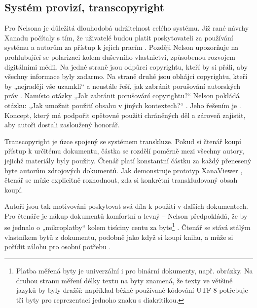 


\subsection{Systém provizí, transcopyright}
\label{sec:transcopyright}

Pro Nelsona je důležitá dlouhodobá udržitelnost celého systému. Již rané návrhy Xanadu počítaly s tím, že uživatelé budou platit poskytovateli za používání systému a autorům za přístup k jejich pracím \autocite{Nelson1972a}.
Později Nelson upozorňuje na prohlubující se polarizaci kolem duševního vlastnictví, způsobenou rozvojem digitálními médii. Na jedné straně jsou odpůrci copyrightu, kteří by si přáli, aby všechny informace byly zadarmo. Na straně druhé jsou obhájci copyrightu, kteří by „nejraději vše uzamkli“ a neustále řeší, jak zabránit porušování autorských práv \autocite{xanalogical}.
Namísto otázky „Jak zabránit porušování copyrightu?“ Nelson pokládá otázku: „Jak umožnit použití obsahu v jiných kontextech?“ \autocite{Transcopyright}. Jeho řešením je . Koncept, který má podpořit opětovné použití chráněných děl a zároveň zajistit, aby autoři dostali zasloužený honorář.

Transcopyright je úzce spojený se systémem transkluze. Pokud si čtenář koupí přístup k určitému dokumentu, částka se rozdělí poměrně mezi všechny autory, jejichž materiály byly použity. Čtenář platí konstantní částku za každý přenesený byte autorům zdrojových dokumentů. Jak demonstruje prototyp XanaViewer , čtenář se může explicitně rozhodnout, zda si konkrétní transkludovaný obsah koupí.

Autoři jsou tak motivováni poskytovat svá díla k použití v dalších dokumentech. Pro čtenáře je nákup dokumentů komfortní a levný -- Nelson předpokládá, že by se jednalo o „mikroplatby“ kolem tisíciny centu za byte\footnote{Platba měřená byty je univerzální i pro binární dokumenty, např. obrázky. Na druhou stranu měření délky textu na byty znamená, že texty ve většině jazyků by byly dražší: například běžně používané kódování UTF-8 potřebuje tři byty pro reprezentaci jednoho znaku s diakritikou.}
\autocite[5/11]{LitMachines}. Čtenář se stává stálým vlastníkem bytů z dokumentu, podobně jako když si koupí knihu, a může si pořídit zálohu pro osobní potřebu \autocite{Transcopyright}.

